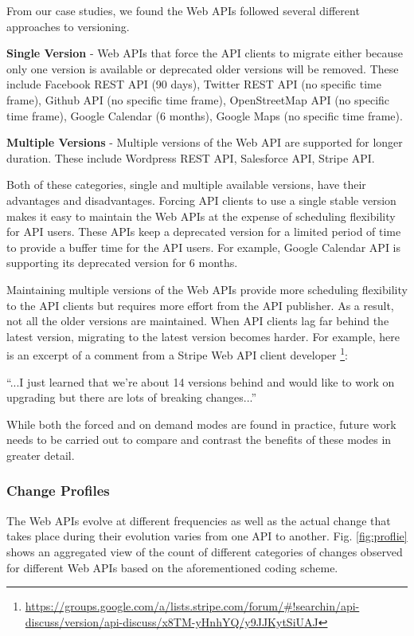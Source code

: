 \documentclass[conference]{IEEEtran}
\begin{document}
From our case studies, we found the Web APIs followed several different approaches to versioning.

\textbf{Single Version} - Web APIs that force the API clients to migrate either because only one version is available or deprecated older versions will be removed. These include Facebook REST API (90 days), Twitter REST API (no specific time frame), Github API (no specific time frame), OpenStreetMap API (no specific time frame), Google Calendar (6 months), Google Maps (no specific time frame).

\textbf{Multiple Versions} - Multiple versions of the Web API are supported for longer duration. These include Wordpress REST API, Salesforce API, Stripe API.

Both of these categories, single and multiple available versions, have their advantages and disadvantages. Forcing API clients to use a single stable version makes it easy to maintain the Web APIs at the expense of scheduling flexibility for API users. These APIs keep a deprecated version for a limited period of time to provide a buffer time for the API users. For example, Google Calendar API is supporting its deprecated version for 6 months.

Maintaining multiple versions of the Web APIs provide more scheduling flexibility to the API clients but requires more effort from the API publisher. As a result, not all the older versions are maintained. When API clients lag far behind the latest version, migrating to the latest version becomes harder. For example, here is an excerpt of a comment from a Stripe Web API client developer \footnote{\url{https://groups.google.com/a/lists.stripe.com/forum/#!searchin/api-discuss/version/api-discuss/x8TM-yHnhYQ/y9JJKytSiUAJ}}:

\small
``...I just learned that we're about 14 versions behind and would like to work on upgrading but there are lots of breaking changes...''
\normalsize

While both the forced and on demand modes are found in practice, future work needs to be carried out to compare and contrast the benefits of these modes in greater detail.



\subsubsection{Change Profiles}
The Web APIs evolve at different frequencies as well as the actual change that takes place during their evolution varies from one API to another. Fig. \ref{fig:proflie} shows an aggregated view of the count of different categories of changes observed for different Web APIs based on the aforementioned coding scheme.
\end{document}
